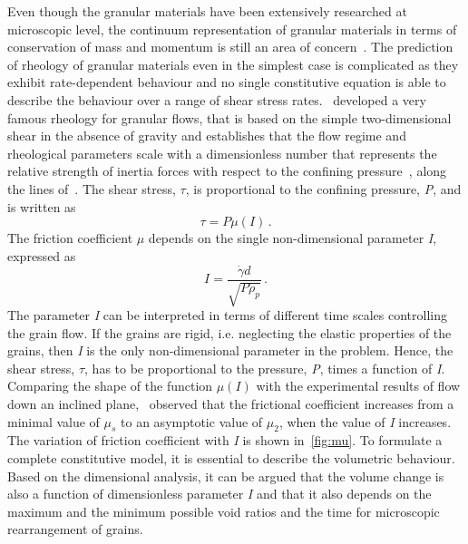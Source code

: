 Even though the granular materials have been extensively researched at 
microscopic level, the 
continuum representation of granular materials in terms of conservation of mass 
and momentum is still an area of concern~\citep{Midi2004,Daniel2007}. The 
prediction of rheology of granular materials even in the simplest case is 
complicated as they exhibit rate-dependent behaviour and no single constitutive 
equation is able to describe the behaviour over a range of shear stress 
rates.~\citet{DaCruz2005} developed a very famous rheology for granular flows, 
that is based on the simple two-dimensional shear in the absence of gravity and 
establishes that the flow regime and rheological parameters scale with a 
dimensionless number that represents the relative strength of inertia forces 
with respect to the confining pressure~\citep{Daniel2007}, along the lines 
of~\citet{Savage1991}. The shear stress, $\tau$, is proportional to the 
confining pressure, \textit{P}, and is written as
%
\begin{equation}
\tau = \textit{P} \mu (\textit{I}) \,.
\end{equation}
%
The friction coefficient $\mu$ depends on the single non-dimensional parameter 
\textit{I}, expressed as
\begin{equation}
\textit{I} = \frac{\dot{\gamma}d}{\sqrt{\textit{P}\rho_{\textit{p}}}} \,.
\end{equation}
%
The parameter \textit{I} can be interpreted in terms of different time scales 
controlling the grain flow. If the grains are rigid, i.e. neglecting the 
elastic properties of the grains, then \textit{I} is the only 
non-dimensional parameter in the problem. Hence, the shear stress, $\tau$, has 
to be proportional to the pressure, \textit{P}, times a function of \textit{I}. 
Comparing the shape of the function $\mu(\textit{I})$ with the experimental 
results of flow down an inclined plane,~\citet{Jop2006} observed that the 
frictional coefficient increases from a minimal value of $\mu_{\textit{s}}$ to 
an asymptotic value of $\mu_{2}$, when the value of \textit{I} increases. The 
variation of friction coefficient with \textit{I} is shown in~\cref{fig:mu}. 
To formulate a complete constitutive model, it is 
essential to describe the volumetric behaviour. Based on the dimensional 
analysis, it can be argued that the volume change is also a function of 
dimensionless parameter \textit{I} and that it also depends on the maximum and 
the minimum possible void ratios and the time for microscopic rearrangement of 
grains. 

